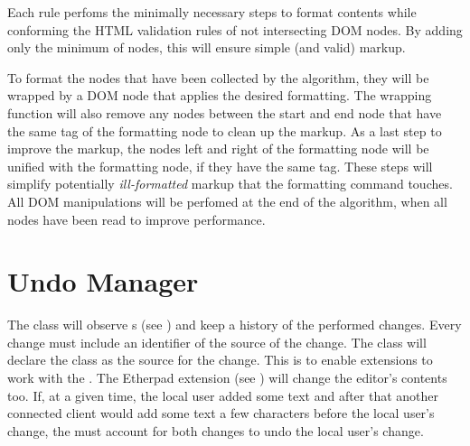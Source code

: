 Each rule perfoms the minimally necessary steps to format contents while conforming the HTML validation rules of not intersecting DOM nodes. By adding only the minimum of nodes, this will ensure simple (and valid) markup.

To format the nodes that have been collected by the algorithm, they will be wrapped by a DOM node that applies the desired formatting. The wrapping function will also remove any nodes between the start and end node that have the same tag of the formatting node to clean up the markup. As a last step to improve the markup, the nodes left and right of the formatting node will be unified with the formatting node, if they have the same tag. These steps will simplify potentially \textit{ill-formatted} markup that the formatting command touches. All DOM manipulations will be perfomed at the end of the algorithm, when all nodes have been read to improve performance.







\section{Undo Manager}
\label{sec:undo_manager}

The  class will observe s (see ) and keep a history of the performed changes. Every change must include an identifier of the source of the change. The  class will declare the  class as the source for the change. This is to enable extensions to work with the . The Etherpad extension (see ) will change the editor's contents too. If, at a given time, the local user added some text and after that another connected client would add some text a few characters before the local user's change, the  must account for both changes to undo the local user's change.

